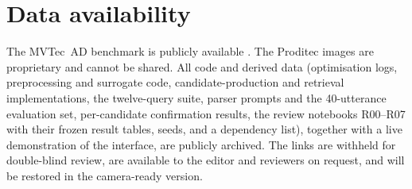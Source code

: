 \documentclass[final,5p,times,twocolumn]{elsarticle}
\begin{document}
\section*{Data availability}
The MVTec~AD benchmark is publicly available
\cite{bergmann_mvtec_2019}. The Proditec images are proprietary and
cannot be shared. All code and derived data (optimisation logs,
preprocessing and surrogate code, candidate-production and retrieval
implementations, the twelve-query suite, parser prompts and the
40-utterance evaluation set, per-candidate confirmation results, the
review notebooks R00--R07 with their frozen result tables, seeds, and a
dependency list), together with a live demonstration of the interface,
are publicly archived. The links are withheld for double-blind review,
are available to the editor and reviewers on request, and will be
restored in the camera-ready version.



\end{document}
